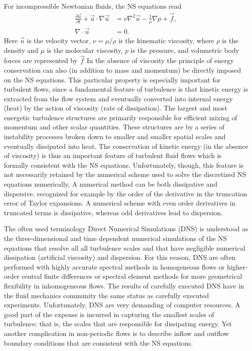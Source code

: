 For incompressible Newtonian fluids, the NS equations read
\begin{align}
 \frac{\partial \vec{u}}{\partial t} + \vec{u} \cdot \nabla \vec{u}
      &= \nu \nabla^2 \vec{u} -\frac{1}{\rho} \nabla p +\vec{f}, \label{eq:mortensen:NS}
\\
 \nabla \cdot \vec{u} &=0.
 \label{eq:mortensen:cont}
\end{align}
Here $\vec{u}$ is the velocity vector, $\nu = \mu/\rho$
is the kinematic viscosity, where $\rho$ is the density and
$\mu$ is the molecular viscosity, $p$
is the pressure, and volumetric body forces are represented by $\vec{f}$
In the absence of viscosity the principle of energy conservation can
also (in addition to mass and momentum) be directly imposed on the NS
equations. This particular property is especially important for turbulent
flows, since a fundamental feature of turbulence is that kinetic energy
is extracted from the flow system and eventually converted into internal
energy (heat) by the action of viscosity (rate of dissipation). The
largest and most energetic turbulence structures are primarily responsible
for efficient mixing of momentum and other scalar quantities. These
structures are by a series of instability processes broken down to
smaller and smaller spatial scales and eventually dissipated into
heat. The conservation of kinetic energy (in the absence of viscosity)
is thus an important feature of turbulent fluid flows which is formally
consistent with the NS equations. Unfortunately, though, this feature
is not necessarily retained by the numerical scheme used to solve the
discretized NS equations numerically. A numerical method can be both
dissipative and dispersive, recognized for example by the order of the
derivative in the truncation error of Taylor expansions. A numerical
scheme with even order derivatives in truncated terms is dissipative,
whereas odd derivatives lead to dispersion.

The often used terminology Direct Numerical Simulations (DNS) is
understood as the three-dimensional and time dependent numerical
simulations of the NS equations that resolve all all turbulence scales
and that have negligible numerical dissipation (artificial viscosity)
and dispersion. For this reason, DNS are often performed with highly
accurate spectral methods \citep{CanutoHussainiQuarteroniEtAl2007}
in homogeneous flows or higher-order central finite differences or
spectral element methods \citep{Blackburn2009} for more geometrical
flexibility in inhomogeneous flows. The results of carefully executed
DNS have in the fluid mechanics community the same status as carefully
executed experiments. Unfortunately, DNS are very demanding of computer
resources. A good part of the expense is incurred in capturing the
smallest scales of turbulence; that is, the scales that are responsible
for dissipating energy. Yet another complication in non-periodic flows
is to describe inflow and outflow boundary conditions that are consistent
with the NS equations.

